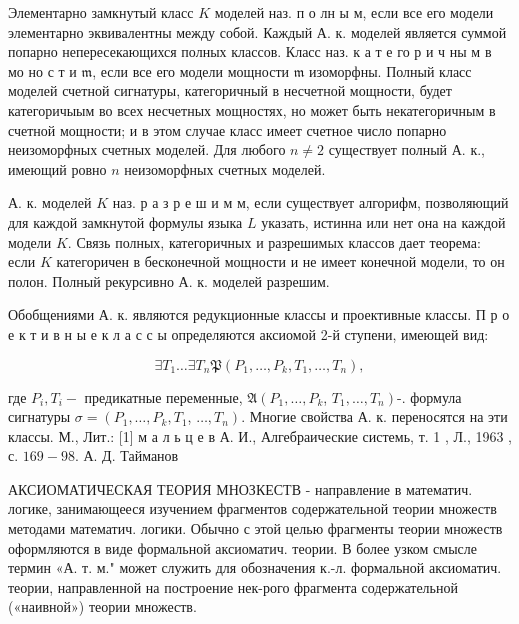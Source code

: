 \documentclass[10pt]{article}
\begin{document}
Элементарно замкнутый класс $K$ моделей наз. п о лн ы м, если все его модели элементарно эквивалентны между собой. Каждый А. к. моделей является суммой попарно непересекающихся полных классов. Класс наз. к а т е го р и ч ны м в мо но с т и $\mathfrak{m}$, если все его модели мощности $\mathfrak{m}$ изоморфны. Полный класс моделей счетной сигнатуры, категоричный в несчетной мощности, будет категоричыым во всех несчетных мощностях, но может быть некатегоричным в счетной мощности; и в этом случае класс имеет счетное число попарно неизоморфных счетных моделей. Для любого $n \neq 2$ существует полный А. к., имеющий ровно $n$ неизоморфных счетных моделей.



А. к. моделей $K$ наз. р а з р е ш и м м, если существует алгорифм, позволяющий для каждой замкнутой формулы языка $L$ указать, истинна или нет она на каждой модели $K$. Связь полных, категоричных и разрешимых классов дает теорема: если $K$ категоричен в бесконечной мощности и не имеет конечной модели, то он полон. Полный рекурсивно А. к. моделей разрешим.



Обобщениями А. к. являются редукционные классы и проективные классы. П р о е к т и в н ы е к л а с с ы определяются аксиомой 2-й ступени, имеющей вид:



\[

\exists T_{1} \ldots \exists T_{n} \mathfrak{P}\left(P_{1}, \ldots, P_{k}, T_{1}, \ldots, T_{n}\right),

\]



где $P_{i}, T_{i}-$ предикатные переменные, $\mathfrak{A}\left(P_{1}, \ldots, P_{k}\right.$, $\left.T_{1}, \ldots, T_{n}\right)$-. формула сигнатуры $\sigma=\left(P_{1}, \ldots, P_{k}, T_{1}\right.$, $\left.\ldots, T_{n}\right)$. Многие свойства А. к. переносятся на эти классы. М., Лит.: [1] м а л ь ц е в А. И., Алгебраические системь, т. 1 , Л., 1963 , с. $169-98$. А. Д. Тайманов



АКСИОМАТИЧЕСКАЯ ТЕОРИЯ МНОЗКЕСТВ - направление в математич. логике, занимающееся изучением фрагментов содержательной теории множеств методами математич. логики. Обычно с этой целью фрагменты теории множеств оформляются в виде формальной аксиоматич. теории. В более узком смысле термин «А. т. м." может служить для обозначения к.-л. формальной аксиоматич. теории, направленной на построение нек-рого фрагмента содержательной («наивной») теории множеств.
\end{document}
